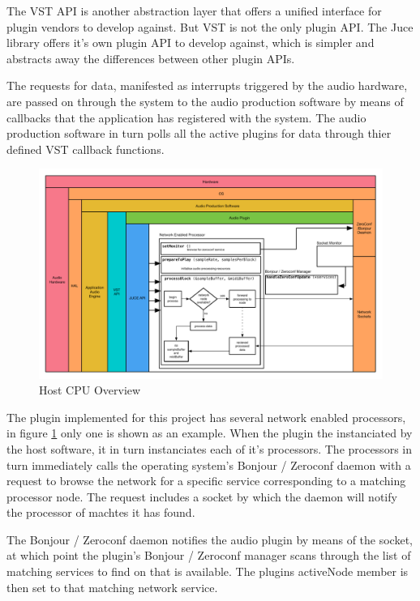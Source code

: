 The VST API is another abstraction layer that offers a unified interface for plugin vendors to develop against. But VST is not the only plugin API. The Juce library offers it's own plugin API to develop against, which is simpler and abstracts away the differences between other plugin APIs.

The requests for data, manifested as interrupts triggered by the audio hardware, are passed on through the system to the audio production software by means of callbacks that the application has registered with the system. The audio production software in turn polls all the active plugins for data through thier defined VST callback functions.

\begin{figure}[H]
    \centering
    \includegraphics[width=\textwidth]{assets/architecture_02.pdf}
    \caption{Host CPU Overview}
    \label{fig:arch_02}
\end{figure}

The plugin implemented for this project has several network enabled processors, in figure \ref{fig:arch_02} only one is shown as an example. When the plugin the instanciated by the host software, it in turn instanciates each of it's processors. The processors in turn immediately calls the operating system's Bonjour / Zeroconf daemon with a request to browse the network for a specific service corresponding to a matching processor node. The request includes a socket by which the daemon will notify the processor of machtes it has found.

The Bonjour / Zeroconf daemon notifies the audio plugin by means of the socket, at which point the plugin's Bonjour / Zeroconf manager scans through the list of matching services to find on that is available. The plugins activeNode member is then set to that matching network service.

